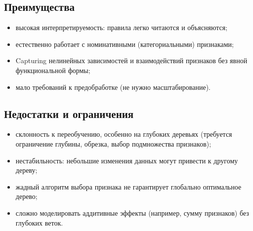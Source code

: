 \documentclass[12pt,a4paper]{article}
\begin{document}
\subsection{Преимущества}
\begin{itemize}
\item высокая интерпретируемость: правила легко читаются и объясняются;
\item естественно работает с номинативными (категориальными) признаками;
\item Capturing нелинейных зависимостей и взаимодействий признаков без явной функциональной формы;
\item мало требований к предобработке (не нужно масштабирование).
\end{itemize}

\subsection{Недостатки и ограничения}
\begin{itemize}
\item склонность к переобучению, особенно на глубоких деревьях (требуется ограничение глубины, обрезка, выбор подмножества признаков);
\item нестабильность: небольшие изменения данных могут привести к другому дереву;
\item жадный алгоритм выбора признака не гарантирует глобально оптимальное дерево;
\item сложно моделировать аддитивные эффекты (например, сумму признаков) без глубоких веток.
\end{itemize}
\end{document}

